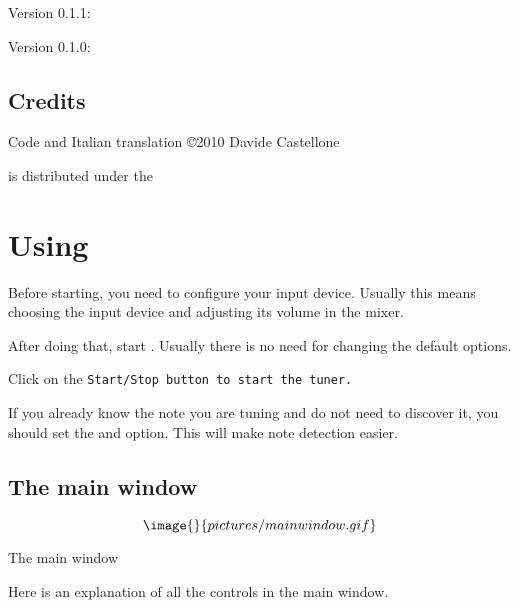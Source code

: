 Version 0.1.1:

Version 0.1.0:


\section{Credits}\label{credits}

Code and Italian translation \copyright 2010 Davide Castellone

 is distributed under the


\chapter{Using }\label{using}

Before starting, you need to configure your input device.
Usually this means choosing the input device and adjusting
its volume in the mixer.

After doing that, start . Usually there is
no need for changing the default options.

Click on the \tt{Start/Stop} button to start the tuner.

If you already know the note you are tuning and do not need to
discover it, you should set the  and
 option.
This will make note detection easier.

\section{The main window}\label{mainwindow}

$$\image{}{pictures/mainwindow.gif}$$
\caption{The main window}

Here is an explanation of all the controls in the main window.

